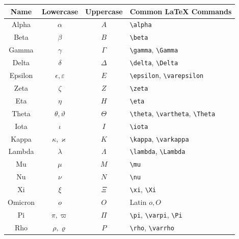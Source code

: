 \begin{center}
\begin{tabular}{c|c|c|l}
\textbf{Name}
&
\textbf{Lowercase}
&
\textbf{Uppercase}
&
\textbf{Common LaTeX Commands}
\\ \hline

Alpha
&
\(\alpha\)
&
\(A\)
&
\verb|\alpha|
\\

Beta
&
\(\beta\)
&
\(B\)
&
\verb|\beta|
\\

Gamma
&
\(\gamma\)
&
\(\Gamma\)
&
\verb|\gamma|, \verb|\Gamma|
\\

Delta
&
\(\delta\)
&
\(\Delta\)
&
\verb|\delta|, \verb|\Delta|
\\

Epsilon
&
\(\epsilon,\varepsilon\)
&
\(E\)
&
\verb|\epsilon|, \verb|\varepsilon|
\\

Zeta
&
\(\zeta\)
&
\(Z\)
&
\verb|\zeta|
\\

Eta
&
\(\eta\)
&
\(H\)
&
\verb|\eta|
\\

Theta
&
\(\theta,\vartheta\)
&
\(\Theta\)
&
\verb|\theta|, \verb|\vartheta|, \verb|\Theta|
\\

Iota
&
\(\iota\)
&
\(I\)
&
\verb|\iota|
\\

Kappa
&
\(\kappa,\varkappa\)
&
\(K\)
&
\verb|\kappa|, \verb|\varkappa|
\\

Lambda
&
\(\lambda\)
&
\(\Lambda\)
&
\verb|\lambda|, \verb|\Lambda|
\\

Mu
&
\(\mu\)
&
\(M\)
&
\verb|\mu|
\\

Nu
&
\(\nu\)
&
\(N\)
&
\verb|\nu|
\\

Xi
&
\(\xi\)
&
\(\Xi\)
&
\verb|\xi|, \verb|\Xi|
\\

Omicron
&
\(o\)
&
\(O\)
&
Latin \(o,O\)
\\

Pi
&
\(\pi,\varpi\)
&
\(\Pi\)
&
\verb|\pi|, \verb|\varpi|, \verb|\Pi|
\\

Rho
&
\(\rho,\varrho\)
&
\(P\)
&
\verb|\rho|, \verb|\varrho|
\\


\end{tabular}
\end{center}
